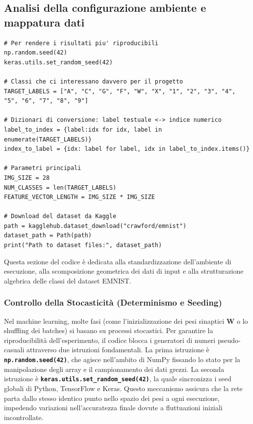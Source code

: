 \documentclass[12pt,a4paper]{article}
\begin{document}
    \subsection{Analisi della configurazione ambiente e mappatura dati}
    \begin{lstlisting}[style=vscode-esatto, caption={Prima configurazione e mappatura dei dati}]
# Per rendere i risultati piu' riproducibili
np.random.seed(42)
keras.utils.set_random_seed(42)

# Classi che ci interessano davvero per il progetto
TARGET_LABELS = ["A", "C", "G", "F", "W", "X", "1", "2", "3", "4", "5", "6", "7", "8", "9"]

# Dizionari di conversione: label testuale <-> indice numerico
label_to_index = {label:idx for idx, label in enumerate(TARGET_LABELS)}
index_to_label = {idx: label for label, idx in label_to_index.items()}

# Parametri principali
IMG_SIZE = 28
NUM_CLASSES = len(TARGET_LABELS)
FEATURE_VECTOR_LENGTH = IMG_SIZE * IMG_SIZE

# Download del dataset da Kaggle
path = kagglehub.dataset_download("crawford/emnist")
dataset_path = Path(path)
print("Path to dataset files:", dataset_path)
	\end{lstlisting}

    Questa sezione del codice è dedicata alla standardizzazione dell'ambiente di esecuzione, alla scomposizione geometrica dei dati di input e alla strutturazione algebrica delle classi del dataset EMNIST.

    \subsubsection{Controllo della Stocasticità (Determinismo e Seeding)}
    Nel machine learning, molte fasi (come l'inizializzazione dei pesi sinaptici $\mathbf{W}$ o lo shuffling dei batches) si basano su processi stocastici. Per garantire la riproducibilità dell'esperimento, il codice blocca i generatori di numeri pseudo-casuali attraverso due istruzioni fondamentali. \newline
    La prima istruzione è \textbf{\texttt{np.random.seed(42)}}, che agisce nell'ambito di NumPy fissando lo stato per la manipolazione degli array e il campionamento dei dati grezzi. \newline
    La seconda istruzione è \textbf{\texttt{keras.utils.set\_random\_seed(42)}}, la quale sincronizza i seed globali di Python, TensorFlow e Keras. Questo meccanismo assicura che la rete parta dallo stesso identico punto nello spazio dei pesi a ogni esecuzione, impedendo variazioni nell'accuratezza finale dovute a fluttuazioni iniziali incontrollate.
    \smallskip
\end{document}
